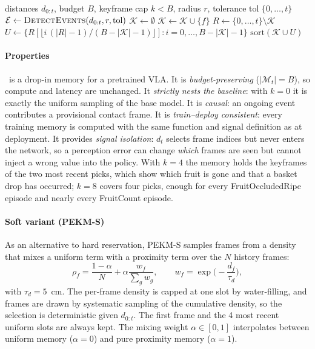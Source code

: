 \begin{algorithm}[t]
\caption{PEKM selection at decision time $t$}
\label{alg:pekm}
\begin{algorithmic}[1]
\Require distances $d_{0:t}$, budget $B$, keyframe cap $k<B$, radius $r$, tolerance $\mathrm{tol}$
 \Return $\{0,\dots,t\}$ \EndIf
\State $\mathcal{E} \gets \textsc{DetectEvents}(d_{0:t}, r, \mathrm{tol})$ 
\State $\mathcal{K} \gets \emptyset$
     $\mathcal{K} \gets \mathcal{K} \cup \{f\}$ \EndIf
  \EndFor
\EndFor
\State $R \gets \{0,\dots,t\} \setminus \mathcal{K}$ 
\State $U \gets \{R[\lfloor i\,(|R|-1)/(B-|\mathcal{K}|-1) \rfloor] : i = 0,\dots,B-|\mathcal{K}|-1\}$ 
\State \Return $\mathrm{sort}(\mathcal{K} \cup U)$
\end{algorithmic}
\end{algorithm}

\paragraph{Properties} \pekm\ is a drop-in memory for a pretrained VLA. It is \emph{budget-preserving} ($|\mathcal{M}_t| = B$), so compute and latency are unchanged. It \emph{strictly nests the baseline}: with $k=0$ it is exactly the uniform sampling of the base model. It is \emph{causal}: an ongoing event contributes a provisional contact frame. It is \emph{train--deploy consistent}: every training memory is computed with the same function and signal definition as at deployment. It provides \emph{signal isolation}: $d_t$ selects frame indices but never enters the network, so a perception error can change \emph{which} frames are seen but cannot inject a wrong value into the policy. With $k=4$ the memory holds the keyframes of the two most recent picks, which show which fruit is gone and that a basket drop has occurred; $k=8$ covers four picks, enough for every FruitOccludedRipe episode and nearly every FruitCount episode.

\paragraph{Soft variant (PEKM-S)} As an alternative to hard reservation, PEKM-S samples frames from a density that mixes a uniform term with a proximity term over the $N$ history frames:
\begin{equation}
\rho_f = \frac{1-\alpha}{N} + \alpha \frac{w_f}{\sum_g w_g},\qquad w_f = \exp\!\Big(-\frac{d_f}{\tau_d}\Big),
\label{eq:soft}
\end{equation}
with $\tau_d=5$~cm. The per-frame density is capped at one slot by water-filling, and frames are drawn by systematic sampling of the cumulative density, so the selection is deterministic given $d_{0:t}$. The first frame and the 4 most recent uniform slots are always kept. The mixing weight $\alpha \in [0,1]$ interpolates between uniform memory ($\alpha=0$) and pure proximity memory ($\alpha=1$).

